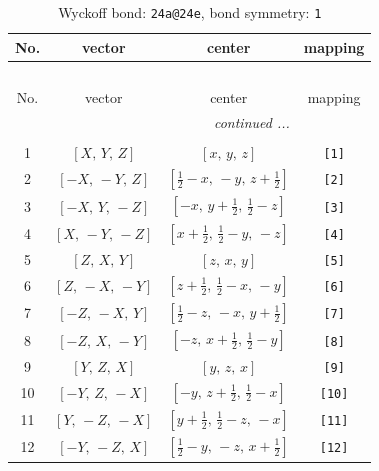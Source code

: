 \documentclass[fleqn,8pt]{jsarticle}
\begin{document}
\begin{longtable}{cccc}
\caption{Wyckoff bond: {\tt 24a@24e}, bond symmetry: {\tt 1}}
 \\
 \hline \hline
No. & vector & center & mapping \\ \hline \endfirsthead

\multicolumn{3}{l}{\tablename\ \thetable{}} \\
 \hline \hline
No. & vector & center & mapping \\ \hline \endhead

 \hline \hline
\multicolumn{3}{r}{\footnotesize\it continued ...} \\ \endfoot

 \hline \hline
\multicolumn{3}{r}{} \\ \endlastfoot

1 & $\left[ X,\, Y,\, Z \right]$ & $\left[ x,\, y,\, z \right]$ & {\tt [1]} \\ \hline
2 & $\left[ - X,\, - Y,\, Z \right]$ & $\left[ \frac{1}{2} - x,\, - y,\, z + \frac{1}{2} \right]$ & {\tt [2]} \\ \hline
3 & $\left[ - X,\, Y,\, - Z \right]$ & $\left[ - x,\, y + \frac{1}{2},\, \frac{1}{2} - z \right]$ & {\tt [3]} \\ \hline
4 & $\left[ X,\, - Y,\, - Z \right]$ & $\left[ x + \frac{1}{2},\, \frac{1}{2} - y,\, - z \right]$ & {\tt [4]} \\ \hline
5 & $\left[ Z,\, X,\, Y \right]$ & $\left[ z,\, x,\, y \right]$ & {\tt [5]} \\ \hline
6 & $\left[ Z,\, - X,\, - Y \right]$ & $\left[ z + \frac{1}{2},\, \frac{1}{2} - x,\, - y \right]$ & {\tt [6]} \\ \hline
7 & $\left[ - Z,\, - X,\, Y \right]$ & $\left[ \frac{1}{2} - z,\, - x,\, y + \frac{1}{2} \right]$ & {\tt [7]} \\ \hline
8 & $\left[ - Z,\, X,\, - Y \right]$ & $\left[ - z,\, x + \frac{1}{2},\, \frac{1}{2} - y \right]$ & {\tt [8]} \\ \hline
9 & $\left[ Y,\, Z,\, X \right]$ & $\left[ y,\, z,\, x \right]$ & {\tt [9]} \\ \hline
10 & $\left[ - Y,\, Z,\, - X \right]$ & $\left[ - y,\, z + \frac{1}{2},\, \frac{1}{2} - x \right]$ & {\tt [10]} \\ \hline
11 & $\left[ Y,\, - Z,\, - X \right]$ & $\left[ y + \frac{1}{2},\, \frac{1}{2} - z,\, - x \right]$ & {\tt [11]} \\ \hline
12 & $\left[ - Y,\, - Z,\, X \right]$ & $\left[ \frac{1}{2} - y,\, - z,\, x + \frac{1}{2} \right]$ & {\tt [12]} \\ \hline

\end{longtable}
\end{document}
